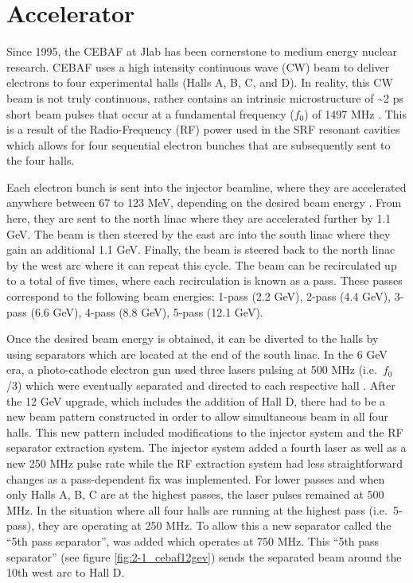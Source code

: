 \documentclass[
]{report}
\begin{document}
\hypertarget{Section-4.1}{%
\section{Accelerator}\label{Section-4.1}}

Since 1995, the CEBAF at Jlab has been cornerstone to medium energy
nuclear research. CEBAF uses a high intensity continuous wave (CW) beam
to deliver electrons to four experimental halls (Halls A, B, C, and D).
In reality, this CW beam is not truly continuous, rather contains an
intrinsic microstructure of \textasciitilde2 ps short beam pulses that
occur at a fundamental frequency (\(f_0\)) of 1497 MHz
\cite{reece_continuous_2016}. This is a result of the Radio-Frequency
(RF) power used in the SRF resonant cavities which allows for four
sequential electron bunches that are subsequently sent to the four
halls.



Each electron bunch is sent into the injector beamline, where they are
accelerated anywhere between 67 to 123 MeV, depending on the desired
beam energy \cite{pilat_12_2012}. From here, they are sent to the north
linac where they are accelerated further by 1.1 GeV. The beam is then
steered by the east arc into the south linac where they gain an
additional 1.1 GeV. Finally, the beam is steered back to the north linac
by the west arc where it can repeat this cycle. The beam can be
recirculated up to a total of five times, where each recirculation is
known as a pass. These passes correspond to the following beam energies:
1-pass (2.2 GeV), 2-pass (4.4 GeV), 3-pass (6.6 GeV), 4-pass (8.8 GeV),
5-pass (12.1 GeV).

Once the desired beam energy is obtained, it can be diverted to the
halls by using separators which are located at the end of the south
linac. In the 6 GeV era, a photo-cathode electron gun used three lasers
pulsing at 500 MHz (i.e.~\(f_0\)/3) which were eventually separated and
directed to each respective hall \cite{kazimi_operational_2019}. After
the 12 GeV upgrade, which includes the addition of Hall D, there had to
be a new beam pattern constructed in order to allow simultaneous beam in
all four halls. This new pattern included modifications to the injector
system and the RF separator extraction system. The injector system added
a fourth laser as well as a new 250 MHz pulse rate while the RF
extraction system had less straightforward changes as a pass-dependent
fix was implemented. For lower passes and when only Halls A, B, C are at
the highest passes, the laser pulses remained at 500 MHz. In the
situation where all four halls are running at the highest pass
(i.e.~5-pass), they are operating at 250 MHz. To allow this a new
separator called the ``5th pass separator'', was added which operates at
750 MHz. This ``5th pass separator'' (see figure
\ref{fig:2-1_cebaf12gev}) sends the separated beam around the 10th west
arc to Hall D.
\end{document}
